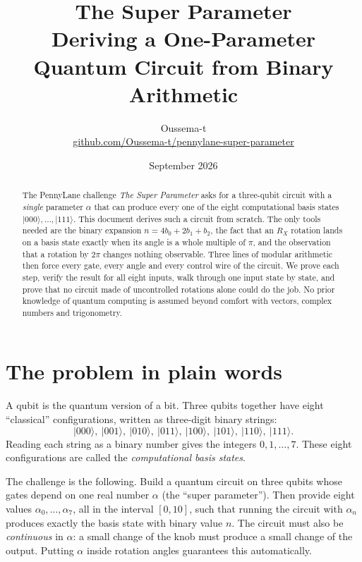 \documentclass[11pt,a4paper]{article}
\title{\textbf{The Super Parameter}\\[4pt]
\large Deriving a One-Parameter Quantum Circuit from Binary Arithmetic}
\author{Oussema-t\\[2pt]\small\href{https://github.com/Oussema-t/pennylane-super-parameter}{github.com/Oussema-t/pennylane-super-parameter}}
\date{September 2026}
\newcommand{\ket}[1]{\lvert #1 \rangle}
\newcommand{\RX}{R_X}
\theoremstyle{plain}
\theoremstyle{definition}
\theoremstyle{remark}
\begin{document}
\maketitle

\begin{abstract}
\noindent
The PennyLane challenge \emph{The Super Parameter} asks for a three-qubit circuit with a
\emph{single} parameter $\alpha$ that can produce every one of the eight computational basis
states $\ket{000},\dots,\ket{111}$. This document derives such a circuit from scratch. The only
tools needed are the binary expansion $n = 4b_0 + 2b_1 + b_2$, the fact that an $\RX$ rotation
lands on a basis state exactly when its angle is a whole multiple of $\pi$, and the observation
that a rotation by $2\pi$ changes nothing observable. Three lines of modular arithmetic then
force every gate, every angle and every control wire of the circuit. We prove each step, verify
the result for all eight inputs, walk through one input state by state, and prove that no circuit
made of uncontrolled rotations alone could do the job. No prior knowledge of quantum computing
is assumed beyond comfort with vectors, complex numbers and trigonometry.
\end{abstract}

{\setcounter{tocdepth}{1}\tableofcontents}
\clearpage

\section{The problem in plain words}

A qubit is the quantum version of a bit. Three qubits together have eight ``classical''
configurations, written as three-digit binary strings:
\[
\ket{000},\ \ket{001},\ \ket{010},\ \ket{011},\ \ket{100},\ \ket{101},\ \ket{110},\ \ket{111}.
\]
Reading each string as a binary number gives the integers $0,1,\dots,7$. These eight
configurations are called the \emph{computational basis states}.

The challenge is the following. Build a quantum circuit on three qubits whose gates depend on
one real number $\alpha$ (the ``super parameter''). Then provide eight values
$\alpha_0,\dots,\alpha_7$, all in the interval $[0,10]$, such that running the circuit with
$\alpha_n$ produces exactly the basis state with binary value $n$. The circuit must also be
\emph{continuous} in $\alpha$: a small change of the knob must produce a small change of the
output. Putting $\alpha$ inside rotation angles guarantees this automatically.
\end{document}
